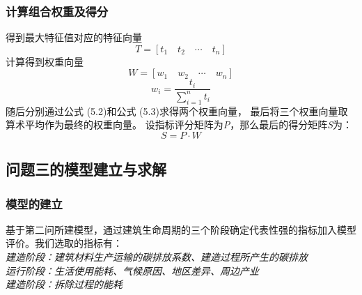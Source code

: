 \documentclass[a4paper, 12pt]{article}
\numberwithin{equation}{section}
\begin{document}
                \subsubsection{计算组合权重及得分}
                    得到最大特征值对应的特征向量
                    \[ T = [t_1 \quad t_2 \quad \cdots \quad t_n] \]
                    \newline
                    计算得到权重向量
                    \[ W = [w_1 \quad w_2 \quad \cdots \quad w_n ] \]
                    \begin{equation*}
                        w_i = \frac{t_i}{\sum_{i=1}^{n} t_i}
                    \end{equation*}
                    \newline
                    随后分别通过公式 (5.2)和公式 (5.3)求得两个权重向量， 最后将三个权重向量取算术平均作为最终的权重向量。
                    设指标评分矩阵为\textit{P}，那么最后的得分矩阵\textit{S}为：
                    \[ S = P \cdot W \]


            \subsection{问题三的模型建立与求解}
                \subsubsection{模型的建立}
                    基于第二问所建模型，通过建筑生命周期的三个阶段确定代表性强的指标加入模型评价。我们选取的指标有： \\
                    \textit{建造阶段：建筑材料生产运输的碳排放系数、建造过程所产生的碳排放} \\
                    \textit{运行阶段：生活使用能耗、气候原因、地区差异、周边产业} \\
                    \textit{建造阶段：拆除过程的能耗}
\end{document}
